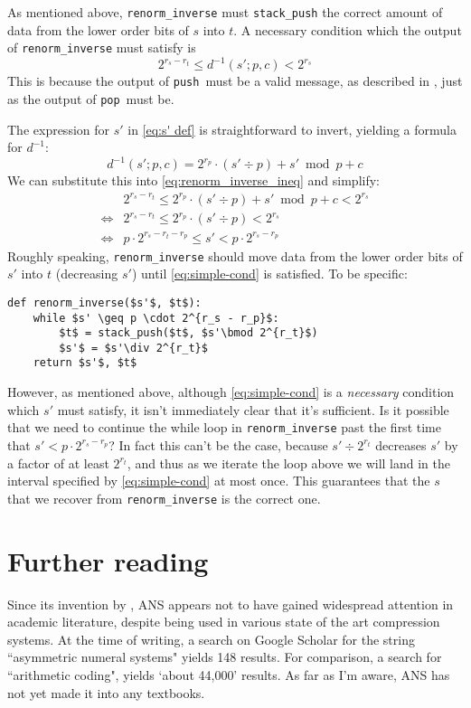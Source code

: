\documentclass{article}
\theoremstyle{definition}
\newcommand{\push}{\texttt{push}}
\newcommand{\pop}{\texttt{pop}}
\begin{document}
As mentioned above, \texttt{renorm\_inverse} must \texttt{stack\_push} the
correct amount of data from the lower order bits of \(s\) into \(t\). A
necessary condition which the output of \texttt{renorm\_inverse} must satisfy
is
\begin{equation}\label{eq:renorm_inverse_ineq}
  2^{r_s - r_t} \leq d^{-1}(s'; p, c) < 2^{r_s}
\end{equation}
This is because the output of \push\ must be a valid message, as described in
, just as the output of \pop\ must be.

The expression for \(s'\) in \cref{eq:s' def} is straightforward to invert,
yielding a formula for
\(d^{-1}\):
\begin{equation}
  d^{-1}(s'; p, c) = 2^{r_p} \cdot (s' \div p) + s' \bmod p + c
\end{equation}
We can substitute this into \cref{eq:renorm_inverse_ineq} and simplify:
\begin{align}
  &2^{r_s - r_t} \leq 2^{r_p} \cdot (s' \div p) + s' \bmod p + c < 2^{r_s}\\
  \iff&2^{r_s - r_t} \leq 2^{r_p} \cdot (s' \div p) < 2^{r_s}\\
  \iff&p\cdot2^{r_s - r_t - r_p}\leq s' < p\cdot 2^{r_s -
  r_p}\label{eq:simple-cond}
\end{align}
Roughly speaking, \texttt{renorm\_inverse} should move data from the lower
order bits of \(s'\) into \(t\) (decreasing \(s'\)) until \cref{eq:simple-cond}
is satisfied. To be specific:

\begin{lstlisting}
def renorm_inverse($s'$, $t$):
    while $s' \geq p \cdot 2^{r_s - r_p}$:
        $t$ = stack_push($t$, $s'\bmod 2^{r_t}$)
        $s'$ = $s'\div 2^{r_t}$
    return $s'$, $t$
\end{lstlisting}

However, as mentioned above, although \cref{eq:simple-cond} is a
\emph{necessary} condition which \(s'\) must satisfy, it isn't immediately
clear that it's sufficient. Is it possible that we need to continue the while
loop in \texttt{renorm\_inverse} past the first time that \(s'<p\cdot2^{r_s -
r_p}\)? In fact this can't be the case, because \(s'\div2^{r_t}\) decreases
\(s'\) by a factor of at least \(2^{r_t}\), and thus as we iterate the loop
above we will land in the interval specified by \cref{eq:simple-cond} at most
once. This guarantees that the \(s\) that we recover from
\texttt{renorm\_inverse} is the correct one.

\section{Further reading}
Since its invention by \citet{duda2009}, ANS appears not to have gained
widespread attention in academic literature, despite being used in various
state of the art compression systems. At the time of writing, a search on
Google Scholar for the string ``asymmetric numeral systems" yields 148 results.
For comparison, a search for ``arithmetic coding", yields `about 44,000'
results. As far as I'm aware, ANS has not yet made it into any textbooks.
\end{document}
